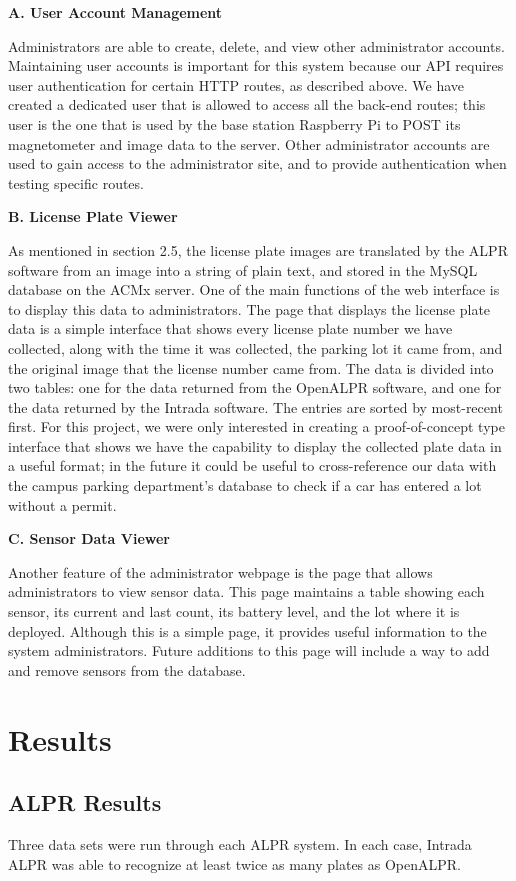 \documentclass[11pt, oneside, fullpage, doublespace]{article}
\begin{document}
\textbf{A. User Account Management}

Administrators are able to create, delete, and view other administrator accounts. Maintaining user accounts is important for this system because our API requires user authentication for certain HTTP routes, as described above. We have created a dedicated user that is allowed to access all the back-end routes; this user is the one that is used by the base station Raspberry Pi to POST its magnetometer and image data to the server. Other administrator accounts are used to gain access to the administrator site, and to provide authentication when testing specific routes.

\textbf{B. License Plate Viewer}

As mentioned in section 2.5, the license plate images are translated by the ALPR software from an image into a string of plain text, and stored in the MySQL database on the ACMx server. One of the main functions of the web interface is to display this data to administrators. The page that displays the license plate data is a simple interface that shows every license plate number we have collected, along with the time it was collected, the parking lot it came from, and the original image that the license number came from. The data is divided into two tables: one for the data returned from the OpenALPR software, and one for the data returned by the Intrada software. The entries are sorted by most-recent first. For this project, we were only interested in creating a proof-of-concept type interface that shows we have the capability to display the collected plate data in a useful format; in the future it could be useful to cross-reference our data with the campus parking department's database to check if a car has entered a lot without a permit.

\textbf{C. Sensor Data Viewer}

Another feature of the administrator webpage is the page that allows administrators to view sensor data. This page maintains a table showing each sensor, its current and last count, its battery level, and the lot where it is deployed. Although this is a simple page, it provides useful information to the system administrators. Future additions to this page will include a way to add and remove sensors from the database.

\section{Results}
\subsection{ALPR Results}
Three data sets were run through each ALPR system. In each case, Intrada ALPR was able to recognize at least twice as many plates as OpenALPR.
\end{document}
